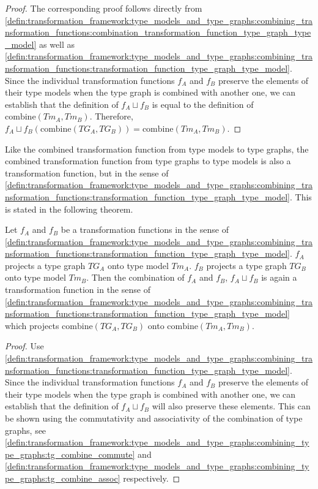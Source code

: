 \begin{proof}
The corresponding proof follows directly from \cref{defin:transformation_framework:type_models_and_type_graphs:combining_transformation_functions:combination_transformation_function_type_graph_type_model} as well as \cref{defin:transformation_framework:type_models_and_type_graphs:combining_transformation_functions:transformation_function_type_graph_type_model}. Since the individual transformation functions $f_A$ and $f_B$ preserve the elements of their type models when the type graph is combined with another one, we can establish that the definition of $f_{A} \sqcup f_{B}$ is equal to the definition of $\mathrm{combine}(Tm_A, Tm_B)$. Therefore, $f_{A} \sqcup f_{B}(\mathrm{combine}(TG_A, TG_B)) = \mathrm{combine}(Tm_A, Tm_B)$.
\end{proof}

Like the combined transformation function from type models to type graphs, the combined transformation function from type graphs to type models is also a transformation function, but in the sense of \cref{defin:transformation_framework:type_models_and_type_graphs:combining_transformation_functions:transformation_function_type_graph_type_model}. This is stated in the following theorem.

\begin{thm}
\label{defin:transformation_framework:type_models_and_type_graphs:combining_transformation_functions:tmod_combine_mapping_function_correct}
Let $f_A$ and $f_B$ be a transformation functions in the sense of \cref{defin:transformation_framework:type_models_and_type_graphs:combining_transformation_functions:transformation_function_type_graph_type_model}. $f_A$ projects a type graph $TG_A$ onto type model $Tm_A$. $f_B$ projects a type graph $TG_B$ onto type model $Tm_B$. Then the combination of $f_A$ and $f_B$, $f_{A} \sqcup f_{B}$ is again a transformation function in the sense of \cref{defin:transformation_framework:type_models_and_type_graphs:combining_transformation_functions:transformation_function_type_graph_type_model} which projects $\mathrm{combine}(TG_A, TG_B)$ onto $\mathrm{combine}(Tm_A, Tm_B)$.
\end{thm}

\begin{proof}
Use \cref{defin:transformation_framework:type_models_and_type_graphs:combining_transformation_functions:transformation_function_type_graph_type_model}. Since the individual transformation functions $f_A$ and $f_B$ preserve the elements of their type models when the type graph is combined with another one, we can establish that the definition of $f_{A} \sqcup f_{B}$ will also preserve these elements. This can be shown using the commutativity and associativity of the combination of type graphs, see \cref{defin:transformation_framework:type_models_and_type_graphs:combining_type_graphs:tg_combine_commute} and \cref{defin:transformation_framework:type_models_and_type_graphs:combining_type_graphs:tg_combine_assoc} respectively.
\end{proof}